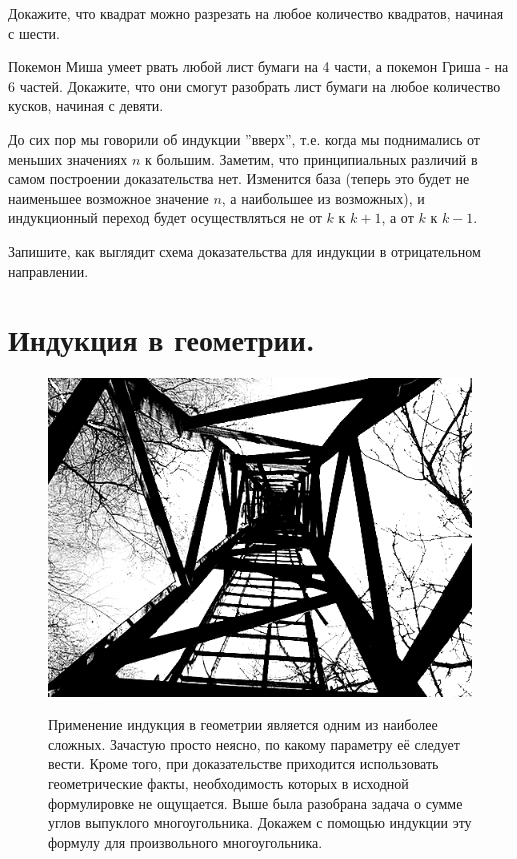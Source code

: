 \begin{thm}
Докажите, что квадрат можно разрезать на любое количество квадратов, начиная с шести.
\end{thm}

\begin{thm}
Покемон Миша умеет рвать любой лист бумаги на 4 части, а покемон Гриша - на 6 частей. Докажите, что они смогут разобрать лист бумаги на любое количество кусков, начиная с девяти.
\end{thm}

\par

До сих пор мы говорили об индукции ''вверх'', т.е. когда мы поднимались от меньших значениях $n$ к большим. Заметим, что принципиальных различий в самом построении доказательства нет. Изменится база (теперь это будет не наименьшее возможное значение $n$, а наибольшее из возможных), и индукционный
переход будет осуществляться не от $k$ к $k + 1$, а от $k$ к $k - 1$.

\begin{ex}
Запишите, как выглядит схема доказательства для индукции в отрицательном направлении.
\end{ex}

\newpage

\section{Индукция в геометрии.}

{\setlength{\intextsep}{2pt}
\begin{figure}[h]
\begin{minipage}{0.3\linewidth}
    \includegraphics[width=0.95\columnwidth]{img/ladder.png}
\end{minipage}
\begin{minipage}{0.69\linewidth}\setlength{\parindent}{1.5em}
Применение индукция в геометрии является одним из наиболее сложных. Зачастую просто неясно, по какому параметру её следует вести. Кроме того, при доказательстве приходится использовать геометрические факты, необходимость которых в исходной формулировке не ощущается. Выше была разобрана задача о сумме углов выпуклого многоугольника. Докажем с помощью индукции эту формулу для произвольного многоугольника.
\end{minipage}
\hfill
\end{figure}}

